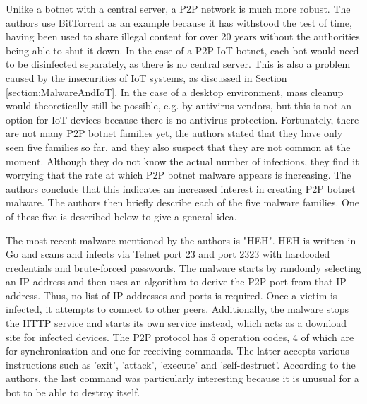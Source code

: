 Unlike a botnet with a central server, a P2P network is much more robust. The authors use BitTorrent as an example because it has withstood the test of time, having been used to share illegal content for over 20 years without the authorities being able to shut it down. In the case of a P2P IoT botnet, each bot would need to be disinfected separately, as there is no central server. This is also a problem caused by the insecurities of IoT systems, as discussed in Section \ref{section:MalwareAndIoT}. In the case of a desktop environment, mass cleanup would theoretically still be possible, e.g. by antivirus vendors, but this is not an option for IoT devices because there is no antivirus protection. Fortunately, there are not many P2P botnet families yet, the authors stated that they have only seen five families so far, and they also suspect that they are not common at the moment. Although they do not know the actual number of infections, they find it worrying that the rate at which P2P botnet malware appears is increasing. The authors conclude that this indicates an increased interest in creating P2P botnet malware. The authors then briefly describe each of the five malware families. One of these five is described below to give a general idea.

The most recent malware mentioned by the authors is "HEH". HEH is written in Go and scans and infects via Telnet port 23 and port 2323 with hardcoded credentials and brute-forced passwords. The malware starts by randomly selecting an IP address and then uses an algorithm to derive the P2P port from that IP address. Thus, no list of IP addresses and ports is required. Once a victim is infected, it attempts to connect to other peers. Additionally, the malware stops the HTTP service and starts its own service instead, which acts as a download site for infected devices. The P2P protocol has 5 operation codes, 4 of which are for synchronisation and one for receiving commands. The latter accepts various instructions such as 'exit', 'attack', 'execute' and 'self-destruct'. According to the authors, the last command was particularly interesting because it is unusual for a bot to be able to destroy itself.


